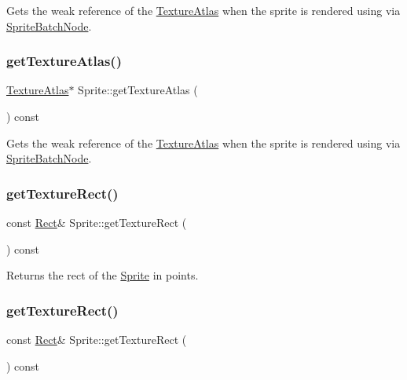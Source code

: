 Gets the weak reference of the \hyperlink{classTextureAtlas}{Texture\+Atlas} when the sprite is rendered using via \hyperlink{classSpriteBatchNode}{Sprite\+Batch\+Node}. \mbox{\label{classSprite_ab4ebd2216b9e419d81581b1072ce1254}} 
\subsubsection{\texorpdfstring{get\+Texture\+Atlas()}{getTextureAtlas()}\hspace{0.1cm}{\footnotesize\ttfamily [2/2]}}
{\footnotesize\ttfamily \hyperlink{classTextureAtlas}{Texture\+Atlas}$\ast$ Sprite\+::get\+Texture\+Atlas (\begin{DoxyParamCaption}{ }\end{DoxyParamCaption}) const\hspace{0.3cm}{\ttfamily [inline]}}

Gets the weak reference of the \hyperlink{classTextureAtlas}{Texture\+Atlas} when the sprite is rendered using via \hyperlink{classSpriteBatchNode}{Sprite\+Batch\+Node}. \mbox{\label{classSprite_a6afd5a0d3f10b55eecebd4adab4004ba}} 
\subsubsection{\texorpdfstring{get\+Texture\+Rect()}{getTextureRect()}\hspace{0.1cm}{\footnotesize\ttfamily [1/2]}}
{\footnotesize\ttfamily const \hyperlink{classRect}{Rect}\& Sprite\+::get\+Texture\+Rect (\begin{DoxyParamCaption}{ }\end{DoxyParamCaption}) const\hspace{0.3cm}{\ttfamily [inline]}}

Returns the rect of the \hyperlink{classSprite}{Sprite} in points. \mbox{\label{classSprite_a6afd5a0d3f10b55eecebd4adab4004ba}} 
\subsubsection{\texorpdfstring{get\+Texture\+Rect()}{getTextureRect()}\hspace{0.1cm}{\footnotesize\ttfamily [2/2]}}
{\footnotesize\ttfamily const \hyperlink{classRect}{Rect}\& Sprite\+::get\+Texture\+Rect (\begin{DoxyParamCaption}{ }\end{DoxyParamCaption}) const\hspace{0.3cm}{\ttfamily [inline]}}

